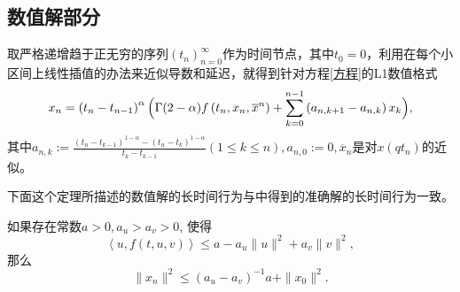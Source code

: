 \subsection{数值解部分}
取严格递增趋于正无穷的序列$\left(t_n\right)_{n=0}^\infty$作为时间节点，其中$t_0=0$，利用在每个小区间上线性插值的办法来近似导数和延迟，就得到针对方程\eqref{方程}的L1数值格式
\begin{equation}\label{L1格式}
    x_n=\left(t_n-t_{n-1}\right)^\alpha \Bigl(\Gamma(2-\alpha) f\left(t_n,x_n,\overline{x}^n\right) + \sum_{k=0}^{n-1} \left(a_{n,k+1}-a_{n,k}\right) x_k\Bigr),
\end{equation}
其中$a_{n,k}:=\frac{\left(t_n-t_{k-1}\right)^{1-\alpha}-\left(t_n-t_{k}\right)^{1-\alpha}}{t_k-t_{k-1}} (1\leqslant k\leqslant n),a_{n,0}:=0,\overline x_n$是对$x(qt_n)$的近似。

下面这个定理所描述的数值解的长时间行为与中得到的准确解的长时间行为一致。
\begin{theorem}
    如果存在常数$a>0,a_u>a_v>0$, 使得
    \begin{equation*}
        \left<u,f(t,u,v)\right>\leqslant a-a_u \|u\|^2+a_v \|v\|^2,
    \end{equation*}
    那么
    \begin{equation}\label{耗散性结果}
        \|x_n\|^2\leqslant \left(a_u-a_v\right)^{-1}a+\|x_0\|^2.
    \end{equation}
\end{theorem}
